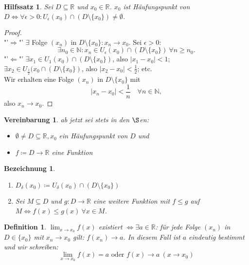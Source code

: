 \documentclass[titlepage,ngerman,a4paper,headsepline]{scrartcl}
\newcommand{\N}{\mathbb{N}}
\newcommand{\R}{\mathbb{R}}
\theoremstyle{named}
\theoremstyle{dotless}
\newtheorem{hilfssatz}[namedtheorem]{Hilfssatz}
\newtheorem*{bezeichnung}{Bezeichnung}
\newtheorem*{definition}{Definition}
\newtheorem*{vereinbarung}{Vereinbarung}
\begin{document}
\begin{hilfssatz} \label{6.1:hsatz}
	Sei $D \subseteq \R$ und $x_{0} \in \R$. $x_{0}$ ist Häufungspunkt von $D \iff \forall \epsilon > 0: U_{\epsilon}(x_{0}) \cap (D \setminus \{ x_{0} \}) \neq \emptyset$.
\end{hilfssatz}

\begin{proof} ~\\
	"'$\Rightarrow$"' $\exists$ Folge $(x_{n})$ in $D \setminus \{ x_{0} \} : x_{n} \rightarrow x_{0}$. Sei $\epsilon > 0$: 
	$$ \exists n_{0} \in \N: x_{n} \in U_{\epsilon}(x_{0}) \cap (D \setminus \{ x_{0} \}) ~\forall n \geq n_{0}. $$
	"'$\Leftarrow$"' $\exists x_{1} \in U_{1}(x_{0}) \cap (D \setminus \{ x_{0} \})$, also $|x_{1} - x_{0}| < 1$; \\
	$\exists x_{2} \in U_{\frac{1}{2}}(x_{0} \cap (D \setminus \{ x_{0} \})$, also $|x_{2} - x_{0}| < \frac{1}{2}$; etc. \\
	Wir erhalten eine Folge $(x_{n})$ in $D \setminus \{ x_{0} \}$ mit 
	$$ |x_{n} - x_{0}| < \frac{1}{n} \quad \forall n \in \N, $$
	also $x_{n} \rightarrow x_{0}$.
\end{proof}


\begin{vereinbarung}
	ab jetzt sei stets in den $\S$en:
	\begin{itemize}
		\item $\emptyset \neq D \subseteq \R, x_{0}$ ein Häufungspunkt von $D$ und
		\item $f \coloneqq D \rightarrow \R$ eine Funktion	
	\end{itemize}
\end{vereinbarung}


\begin{bezeichnung} ~\
	\begin{enumerate}
		\item $D_{\delta}(x_{0}) \coloneqq U_{\delta}(x_{0}) \cap (D \setminus \{ x_{0} \})$
		\item Sei $M \subseteq D$ und $g \colon D \rightarrow \R$ eine weitere Funktion mit $f \leq g$ auf $M \iff f(x) \leq g(x) ~\forall x \in M$.
	\end{enumerate}
\end{bezeichnung}


\begin{definition}
	$\lim_{x \rightarrow x_{0}} f(x)$ existiert $\iff \exists a \in \R$: für jede Folge $(x_{n})$ in $D \in \{ x_{0} \}$ mit $x_{n} \rightarrow x_{0}$ gilt: $f(x_{n}) \rightarrow a$.
	In diesem Fall ist $a$ eindeutig bestimmt und wir schreiben:
		$$ \lim_{x \rightarrow x_{0}} f(x) = a \text{ oder } f(x) \rightarrow a ~(x \rightarrow x_{0}) $$
\end{definition}
\end{document}
